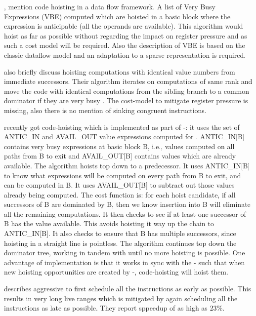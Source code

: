 \documentclass[acmlarge,review,anonymous]{acmart}\settopmatter{printfolios=true}
\begin{document}
\citet{dhamdhere1988fast}, \citet{steven1997advanced} mention
code hoisting in a data flow framework. A list of Very Busy Expressions (VBE)
computed which are hoisted in a basic block where the expression is
anticipable (all the operands are available). This algorithm would hoist as far
as possible without regarding the impact on register pressure and as such a cost
model will be required.  Also the description of VBE is based on the classic
dataflow model and an adaptation to a sparse \SSA{} representation is required.

\citet{rosen1988global} also briefly discuss hoisting computations with
identical value numbers from immediate successors. Their algorithm iterates on
computations of same rank and move the code with identical computations from the
sibling branch to a common dominator if they are very busy
\cite{steven1997advanced}. The cost-model to mitigate register pressure is
missing, also there is no mention of sinking congruent instructions.

\GCC{} recently got code-hoisting \cite{GCCCodeHoisting} which is implemented as
part of \GVN{}-\PRE{}: it uses the set of ANTIC\_IN and AVAIL\_OUT value
expressions computed for \PRE{}. ANTIC\_IN[B] contains very busy expressions at
basic block B, i.e., values computed on all paths from B to exit and
AVAIL\_OUT[B] contains values which are already available. The algorithm hoists
top down to a predecessor.  It uses ANTIC\_IN[B] to know what expressions will
be computed on every path from B to exit, and can be computed in B.  It uses
AVAIL\_OUT[B] to subtract out those values already being computed.  The cost
function is: for each hoist candidate, if all successors of B are dominated by
B, then we know insertion into B will eliminate all the remaining computations.
It then checks to see if at least one successor of B has the value available.
This avoids hoisting it way up the chain to ANTIC\_IN[B].  It also checks to
ensure that B has multiple successors, since hoisting in a straight line is
pointless.  The algorithm continues top down the dominator tree, working in
tandem with \PRE{} until no more hoisting is possible.  One advantage of \GCC{}
implementation is that it works in sync with the \GVN{}-\PRE{} such that when
new hoisting opportunities are created by \GVN{}-\PRE{}, code-hoisting will
hoist them.

\citet{click1995global} describes aggressive \gcm{} to first
schedule all the instructions as early as possible. This results in very long
live ranges which is mitigated by again scheduling all the instructions as late
as possible. They report sppeedup of as high as $23\%$.
\end{document}
